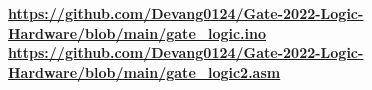 \documentclass[12pt, a4paper]{article}
\begin{document}
\begin{codebox}
																																																																																																																																																																																																																																																							      \textbf{\href{https://github.com/Devang0124/Gate-2022-Logic-Hardware/blob/main/gate_logic.ino}{https://github.com/Devang0124/Gate-2022-Logic-Hardware/blob/main/gate\_logic.ino}}
																																																																																																																																																																																																																																																							      \vspace{0.5cm}
																																																																																																																																																																																																																																																								  \textbf{\href{ https://github.com/Devang0124/Gate-2022-Logic-Hardware/blob/main/gate_logic2.asm}{ https://github.com/Devang0124/Gate-2022-Logic-Hardware/blob/main/gate\_logic2.asm}}
																																																																																																																																																																																																																																																							      \end{codebox}

																																																																																																																																																																																																																																																							      
\end{document}
